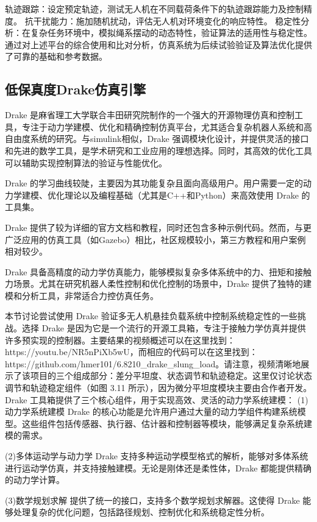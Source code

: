 \documentclass[lang=chs, degree=master, blindreview=false, winfonts=true]{yanputhesis}
\begin{document}
轨迹跟踪：设定预定轨迹，测试无人机在不同载荷条件下的轨迹跟踪能力及控制精度。
抗干扰能力：施加随机扰动，评估无人机对环境变化的响应特性。
稳定性分析：在复杂任务环境中，模拟绳系摆动的动态特性，验证算法的适用性与稳定性。
通过对上述平台的综合使用和比对分析，仿真系统为后续试验验证及算法优化提供了可靠的基础和参考数据。

\subsection{低保真度Drake仿真引擎}
Drake 是麻省理工大学联合丰田研究院制作的一个强大的开源物理仿真和控制工具，专注于动力学建模、优化和精确控制仿真平台，尤其适合复杂机器人系统和高自由度系统的研究。与simulink相似，Drake 强调模块化设计，并提供灵活的接口和先进的数学工具，是学术研究和工业应用的理想选择。同时，其高效的优化工具可以辅助实现控制算法的验证与性能优化。

Drake 的学习曲线较陡，主要因为其功能复杂且面向高级用户。用户需要一定的动力学建模、优化理论以及编程基础（尤其是C++和Python）来高效使用 Drake 的工具集。

Drake 提供了较为详细的官方文档和教程，同时还包含多种示例代码。然而，与更广泛应用的仿真工具（如Gazebo）相比，社区规模较小，第三方教程和用户案例相对较少。

Drake 具备高精度的动力学仿真能力，能够模拟复杂多体系统中的力、扭矩和接触力场景。尤其在研究机器人柔性控制和优化控制的场景中，Drake 提供了独特的建模和分析工具，非常适合力控仿真任务。


本节讨论尝试使用 Drake 验证多无人机悬挂负载系统中控制系统稳定性的一些挑战。选择 Drake 是因为它是一个流行的开源工具箱，专注于接触力学仿真并提供许多预实现的控制器。主要结果的视频概述可以在这里找到：https://youtu.be/NR5nPiXb5wU，而相应的代码可以在这里找到：https://github.com/hmer101/6.8210_drake_slung_load。请注意，视频清晰地展示了该项目的三个组成部分：差分平坦度、状态调节和轨迹稳定。这里仅讨论状态调节和轨迹稳定组件（如图 3.11 所示），因为微分平坦度模块主要由合作者开发。
Drake 工具箱提供了三个核心组件，用于实现高效、灵活的动力学系统建模：
(1)动力学系统建模
Drake 的核心功能是允许用户通过大量的动力学组件构建系统模型。这些组件包括传感器、执行器、估计器和控制器等模块，能够满足复杂系统建模的需求。

(2)多体运动学与动力学
Drake 支持多种运动学模型格式的解析，能够对多体系统进行运动学仿真，并支持接触建模。无论是刚体还是柔性体，Drake 都能提供精确的动力学计算。

(3)数学规划求解
提供了统一的接口，支持多个数学规划求解器。这使得 Drake 能够处理复杂的优化问题，包括路径规划、控制优化和系统稳定性分析。
\end{document}
